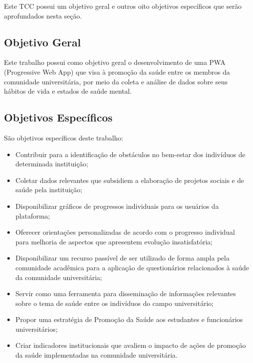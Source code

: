 Este TCC possui um objetivo geral e outros oito objetivos específicos que serão aprofundados nesta seção.

\subsection{Objetivo Geral}

Este trabalho possui como objetivo geral o desenvolvimento de uma PWA (Progressive Web App) que visa à promoção da saúde entre os membros da comunidade universitária, por meio da coleta e análise de dados sobre seus hábitos de vida e estados de saúde mental.

\subsection{Objetivos Específicos}

São objetivos específicos deste trabalho:

\begin{itemize}

\item Contribuir para a identificação de obstáculos no bem-estar dos indivíduos de determinada instituição; 

\item Coletar dados relevantes que subsidiem a elaboração de projetos sociais e de saúde pela instituição;

\item Disponibilizar gráficos de progressos individuais para os usuários da plataforma;

\item Oferecer orientações personalizadas de acordo com o progresso individual para melhoria de aspectos que apresentem evolução insatisfatória;

\item Disponibilizar um recurso passível de ser utilizado de forma ampla pela comunidade acadêmica para a aplicação de questionários relacionados à saúde da comunidade universitária;

\item Servir como uma ferramenta para disseminação de informações relevantes sobre o tema de saúde entre os indivíduos do campo universitário;

\item Propor uma estratégia de Promoção da Saúde aos estudantes e funcionários universitários;

\item Criar indicadores institucionais que avaliem o impacto de ações de promoção da saúde implementadas na comunidade universitária.
\end{itemize}
